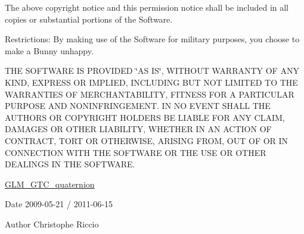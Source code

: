 The above copyright notice and this permission notice shall be included in all copies or substantial portions of the Software.

Restrictions\-: By making use of the Software for military purposes, you choose to make a Bunny unhappy.

T\-H\-E S\-O\-F\-T\-W\-A\-R\-E I\-S P\-R\-O\-V\-I\-D\-E\-D \char`\"{}\-A\-S I\-S\char`\"{}, W\-I\-T\-H\-O\-U\-T W\-A\-R\-R\-A\-N\-T\-Y O\-F A\-N\-Y K\-I\-N\-D, E\-X\-P\-R\-E\-S\-S O\-R I\-M\-P\-L\-I\-E\-D, I\-N\-C\-L\-U\-D\-I\-N\-G B\-U\-T N\-O\-T L\-I\-M\-I\-T\-E\-D T\-O T\-H\-E W\-A\-R\-R\-A\-N\-T\-I\-E\-S O\-F M\-E\-R\-C\-H\-A\-N\-T\-A\-B\-I\-L\-I\-T\-Y, F\-I\-T\-N\-E\-S\-S F\-O\-R A P\-A\-R\-T\-I\-C\-U\-L\-A\-R P\-U\-R\-P\-O\-S\-E A\-N\-D N\-O\-N\-I\-N\-F\-R\-I\-N\-G\-E\-M\-E\-N\-T. I\-N N\-O E\-V\-E\-N\-T S\-H\-A\-L\-L T\-H\-E A\-U\-T\-H\-O\-R\-S O\-R C\-O\-P\-Y\-R\-I\-G\-H\-T H\-O\-L\-D\-E\-R\-S B\-E L\-I\-A\-B\-L\-E F\-O\-R A\-N\-Y C\-L\-A\-I\-M, D\-A\-M\-A\-G\-E\-S O\-R O\-T\-H\-E\-R L\-I\-A\-B\-I\-L\-I\-T\-Y, W\-H\-E\-T\-H\-E\-R I\-N A\-N A\-C\-T\-I\-O\-N O\-F C\-O\-N\-T\-R\-A\-C\-T, T\-O\-R\-T O\-R O\-T\-H\-E\-R\-W\-I\-S\-E, A\-R\-I\-S\-I\-N\-G F\-R\-O\-M, O\-U\-T O\-F O\-R I\-N C\-O\-N\-N\-E\-C\-T\-I\-O\-N W\-I\-T\-H T\-H\-E S\-O\-F\-T\-W\-A\-R\-E O\-R T\-H\-E U\-S\-E O\-R O\-T\-H\-E\-R D\-E\-A\-L\-I\-N\-G\-S I\-N T\-H\-E S\-O\-F\-T\-W\-A\-R\-E.

\hyperlink{group__gtc__quaternion}{G\-L\-M\-\_\-\-G\-T\-C\-\_\-quaternion}

\begin{DoxyDate}{Date}
2009-\/05-\/21 / 2011-\/06-\/15 
\end{DoxyDate}
\begin{DoxyAuthor}{Author}
Christophe Riccio 
\end{DoxyAuthor}
